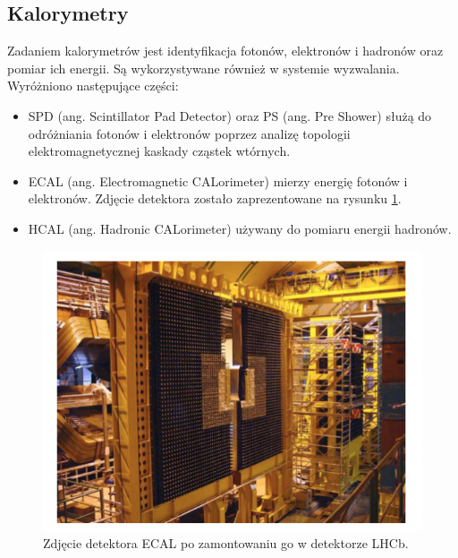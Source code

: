 \subsection{Kalorymetry}
Zadaniem  kalorymetrów jest identyfikacja fotonów, elektronów i hadronów oraz pomiar ich energii. Są wykorzystywane również w systemie wyzwalania. Wyróżniono następujące części:
\begin{itemize}
\item SPD (ang. Scintillator Pad Detector) oraz PS (ang. Pre Shower) służą do odróżniania fotonów i elektronów poprzez analizę topologii elektromagnetycznej kaskady cząstek wtórnych.
\item ECAL (ang. Electromagnetic CALorimeter) mierzy energię fotonów i elektronów. Zdjęcie detektora zostało zaprezentowane na rysunku \ref{fig:ECAl}.
\item HCAL (ang. Hadronic CALorimeter) używany do pomiaru energii hadronów.
\end{itemize}
\begin{figure}[th] 
  \centering
  \includegraphics[scale=0.7]{rozdzial2/ECAL.png}
  \caption{Zdjęcie detektora ECAL po zamontowaniu go w detektorze LHCb.}
  \label{fig:ECAl}
\end{figure}



